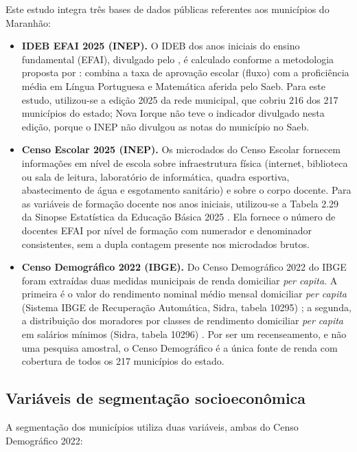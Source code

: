 Este estudo integra três bases de dados públicas referentes aos municípios do Maranhão:

\begin{itemize}
    \item \textbf{IDEB EFAI 2025 (INEP).} O IDEB dos anos iniciais do ensino fundamental (EFAI), divulgado pelo \citet{inep2025}, é calculado conforme a metodologia proposta por \citet{fernandes2007}: combina a taxa de aprovação escolar (fluxo) com a proficiência média em Língua Portuguesa e Matemática aferida pelo Saeb. Para este estudo, utilizou-se a edição 2025 da rede municipal, que cobriu 216 dos 217 municípios do estado; Nova Iorque não teve o indicador divulgado nesta edição, porque o INEP não divulgou as notas do município no Saeb.

    \item \textbf{Censo Escolar 2025 (INEP).} Os microdados do Censo Escolar \citep{inep2026microdados} fornecem informações em nível de escola sobre infraestrutura física (internet, biblioteca ou sala de leitura, laboratório de informática, quadra esportiva, abastecimento de água e esgotamento sanitário) e sobre o corpo docente. Para as variáveis de formação docente nos anos iniciais, utilizou-se a Tabela 2.29 da Sinopse Estatística da Educação Básica 2025 \citep{inep2026sinopse}. Ela fornece o número de docentes EFAI por nível de formação com numerador e denominador consistentes, sem a dupla contagem presente nos microdados brutos.

    \item \textbf{Censo Demográfico 2022 (IBGE).} Do Censo Demográfico 2022 do IBGE foram extraídas duas medidas municipais de renda domiciliar \textit{per capita}. A primeira é o valor do rendimento nominal médio mensal domiciliar \textit{per capita} (Sistema IBGE de Recuperação Automática, Sidra, tabela 10295) \citep{ibge2022}; a segunda, a distribuição dos moradores por classes de rendimento domiciliar \textit{per capita} em salários mínimos (Sidra, tabela 10296) \citep{ibge2022classes}. Por ser um recenseamento, e não uma pesquisa amostral, o Censo Demográfico é a única fonte de renda com cobertura de todos os 217 municípios do estado.
\end{itemize}

\subsection{Variáveis de segmentação socioeconômica}

A segmentação dos municípios utiliza duas variáveis, ambas do Censo Demográfico 2022:

